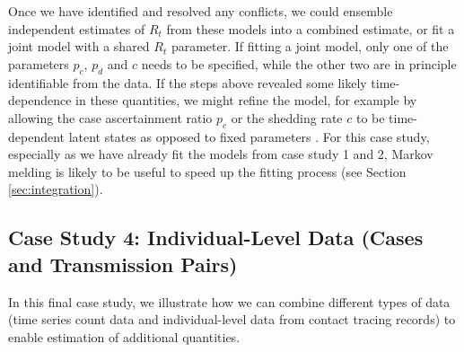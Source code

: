 \documentclass{article}
\begin{document}
\begin{enumerate}
    Once we have identified and resolved any conflicts, we could ensemble independent estimates of $R_t$ from these models into a combined estimate, or fit a joint model with a shared $R_t$ parameter. If fitting a joint model, only one of the parameters $p_c$, $p_d$ and $c$ needs to be specified, while the other two are in principle identifiable from the data. If the steps above revealed some likely time-dependence in these quantities, we might refine the model, for example by allowing the case ascertainment ratio $p_c$ or the shedding rate $c$ to be time-dependent latent states as opposed to fixed parameters \citep{watson2024jointly}. For this case study, especially as we have already fit the models from case study 1 and 2, Markov melding is likely to be useful to speed up the fitting process (see Section \ref{sec:integration}).
\end{enumerate}

\subsection{Case Study 4: Individual-Level Data (Cases and Transmission Pairs)}

In this final case study, we illustrate how we can combine different types of data (time series count data and individual-level data from contact tracing records) to enable estimation of additional quantities. 
\end{document}
